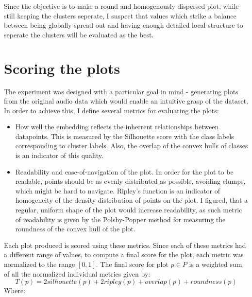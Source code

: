 \documentclass[a4paper, 12pt, twoside]{report}
\begin{document}
Since the objective is to make a round and homogenously dispersed plot, while still keeping the clusters seperate, I suspect that values which strike a balance between being globally spread out and having enough detailed local structure to seperate the clusters will be evaluated as the best.

\section{Scoring the plots}
\label{sec:org007743d}

The experiment was designed with a particular goal in mind - generating plots from the original audio data which would enable an intuitive grasp of the dataset. In order to achieve this, I define several metrics for evaluating the plots:
\begin{itemize}
\item How well the embedding reflects the inherrent relationships between datapoints. This is measured by the Silhouette score with the class labels corresponding to cluster labels. Also, the overlap of the convex hulls of classes is an indicator of this quality.
\item Readability and ease-of-navigation of the plot. In order for the plot to be readable, points should be as evenly distributed as possible, avoiding clumps, which might be hard to navigate. Ripley's function is an indicator of homogeneity of the density distribution of points on the plot. I figured, that a regular, uniform shape of the plot would increase readability, as such metric of readability is given by the Polsby-Popper method for measuring the roundness of the convex hull of the plot.
\end{itemize}
Each plot produced is scored using these metrics. Since each of these metrics had a different range of values, to compute a final score for the plot, each metric was normalized to the range \([0, 1]\). The final score for plot \(p \in P\) is a weighted sum of all the normalized individual metrics given by:
\[T(p) = 2silhouette(p) + 2ripley(p) + overlap(p) + roundness(p) \]
Where:
\end{document}
